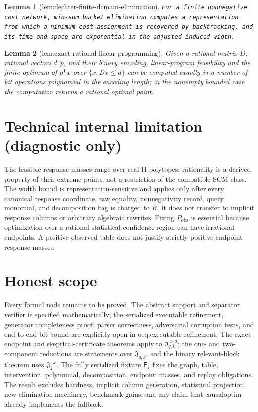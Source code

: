 \documentclass{article}
\newtheorem{lemma}{Lemma}
\begin{document}
\begin{lemma}[lem:dechter-finite-domain-elimination]\label{lem:dechter-finite-domain-elimination}
\texttt{For a finite nonnegative cost network,\allowbreak{} min-\allowbreak{}sum bucket elimination computes a representation from which a minimum-\allowbreak{}cost assignment is recovered by backtracking,\allowbreak{} and its time and space are exponential in the adjusted induced width.}
\end{lemma}

\begin{lemma}[lem:exact-rational-linear-programming]\label{lem:exact-rational-linear-programming}
Given a rational matrix \(D\), rational vectors \(d,p\), and their binary encoding, linear-program feasibility and the finite optimum of \(p^{\mathsf T}x\) over \(\{x:Dx\le d\}\) can be computed exactly in a number of bit operations polynomial in the encoding length; in the nonempty bounded case the computation returns a rational optimal point.
\end{lemma}

\section*{Technical internal limitation (diagnostic only)}

The feasible response masses range over real H-polytopes; rationality is a derived property of their extreme points, not a restriction of the compatible-SCM class. The width bound is representation-sensitive and applies only after every canonical response coordinate, raw equality, nonnegativity record, query monomial, and decomposition bag is charged to \(B\). It does not transfer to implicit response columns or arbitrary algebraic rewrites. Fixing \(P_{\mathrm{obs}}\) is essential because optimization over a rational statistical confidence region can have irrational endpoints. A positive observed table does not justify strictly positive endpoint response masses.

\section{Honest scope}

Every formal node remains to be proved. The abstract support and separator verifier is specified mathematically; the serialized executable refinement, generator completeness proof, parser correctness, adversarial corruption tests, and end-to-end bit bound are explicitly open in \(\text{oeq:executable-refinement}\). The exact endpoint and skeptical-certificate theorems apply to \(\mathfrak I_{q,k}^{\ge3}\); the one- and two-component reductions are statements over \(\mathfrak J_{q,k}\), and the binary relevant-block theorem uses \(\mathfrak J_2^{\mathrm{nw}}\). The fully serialized fixture \(\mathsf F_\star\) fixes the graph, table, intervention, polynomial, decomposition, endpoint masses, and replay obligations. The result excludes hardness, implicit column generation, statistical projection, new elimination machinery, benchmark gains, and any claim that causaloptim already implements the fallback.
\end{document}
